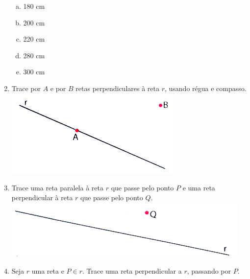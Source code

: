 \documentclass[a4paper,14pt]{article}
\begin{document}
\begin{multicols}{2}
\begin{enumerate}
   			\begin{enumerate}[a)]
   				\item 180 cm
   				\item 200 cm
   				\item 220 cm
   				\item 280 cm
   				\item 300 cm
   			\end{enumerate}
   			\item Trace por $A$ e por $B$ retas perpendiculares à reta $r$, usando régua e compasso. \\
   			\includegraphics[width=1\linewidth]{6FMA70_imagens/imagem8} \\
   			\item Trace uma reta paralela à reta $r$ que passe pelo ponto $P$ e uma reta perpendicular à reta $r$ que passe pelo ponto $Q$. \\
   			\includegraphics[width=1\linewidth]{6FMA70_imagens/imagem9} \\
   			\item Seja $r$ uma reta e $P \in r$. Trace uma reta perpendicular a $r$, passando por $P$.
	    \end{enumerate} 

\end{multicols}
\end{document}
